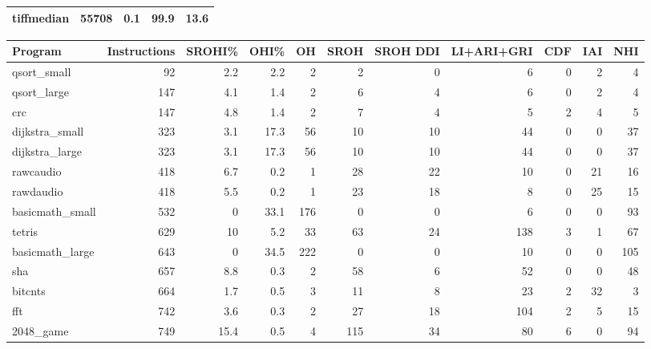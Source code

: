 \begin{tabular}{lrrrr}
 tiffmedian      &   55708 &    0.1 &         99.9 &    13.6 \\
\hline
\end{tabular}\begin{tabular}{lrrrrrrrrrr}
\hline
 Program         &   Instructions &   SROHI\% &   OHI\% &   OH &   SROH &   SROH DDI &   LI+ARI+GRI &   CDF &   IAI &   NHI \\
\hline
 qsort\_small     &             92 &      2.2 &    2.2 &    2 &      2 &          0 &            6 &     0 &     2 &     4 \\
 qsort\_large     &            147 &      4.1 &    1.4 &    2 &      6 &          4 &            6 &     0 &     2 &     4 \\
 crc             &            147 &      4.8 &    1.4 &    2 &      7 &          4 &            5 &     2 &     4 &     5 \\
 dijkstra\_small  &            323 &      3.1 &   17.3 &   56 &     10 &         10 &           44 &     0 &     0 &    37 \\
 dijkstra\_large  &            323 &      3.1 &   17.3 &   56 &     10 &         10 &           44 &     0 &     0 &    37 \\
 rawcaudio       &            418 &      6.7 &    0.2 &    1 &     28 &         22 &           10 &     0 &    21 &    16 \\
 rawdaudio       &            418 &      5.5 &    0.2 &    1 &     23 &         18 &            8 &     0 &    25 &    15 \\
 basicmath\_small &            532 &      0   &   33.1 &  176 &      0 &          0 &            6 &     0 &     0 &    93 \\
 tetris          &            629 &     10   &    5.2 &   33 &     63 &         24 &          138 &     3 &     1 &    67 \\
 basicmath\_large &            643 &      0   &   34.5 &  222 &      0 &          0 &           10 &     0 &     0 &   105 \\
 sha             &            657 &      8.8 &    0.3 &    2 &     58 &          6 &           52 &     0 &     0 &    48 \\
 bitcnts         &            664 &      1.7 &    0.5 &    3 &     11 &          8 &           23 &     2 &    32 &     3 \\
 fft             &            742 &      3.6 &    0.3 &    2 &     27 &         18 &          104 &     2 &     5 &    15 \\
 2048\_game       &            749 &     15.4 &    0.5 &    4 &    115 &         34 &           80 &     6 &     0 &    94 \\

\end{tabular}
